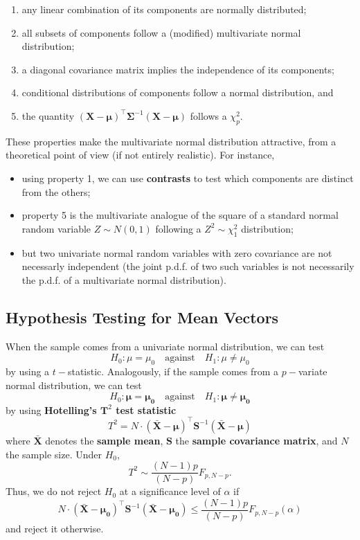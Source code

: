 \begin{enumerate}[noitemsep]
    \item any linear combination of its components are normally distributed;
    \item all subsets of components follow a (modified) multivariate normal distribution;
    \item a diagonal covariance matrix implies the independence of its components;
    \item conditional distributions of components follow a normal distribution, and 
    \item the quantity $(\bm{X}-\bm{\mu})^{\!\top}\bm{\Sigma}^{-1}(\bm{X}-\bm{\mu})$ follows a $\chi^{2}_{p}$.
\end{enumerate}
These properties make the multivariate normal distribution attractive, from a theoretical point of view (if not entirely realistic). For instance, 
\begin{itemize}[noitemsep]
\item using property 1, we can use \textbf{contrasts} to test which components are distinct from the others; \item property 5 is the multivariate analogue of the square of a standard normal random variable $Z\sim N(0,1)$ following a $Z^2\sim \chi^2_1$ distribution;
\item but two univariate normal random variables with zero covariance are not necessarly independent (the joint p.d.f. of two such variables is not necessarily the p.d.f. of a multivariate normal distribution).
\end{itemize}
\subsection{Hypothesis Testing for Mean Vectors}
When the sample comes from a univariate normal distribution, we can test $$H_{0}: \mu=\mu_{0}\quad\mbox{against}\quad H_{1}: \mu \neq \mu_{0}$$ by using a $t-$statistic. Analogously, if the sample comes from a $p-$variate normal distribution, we can test $$H_{0}: \bm{\mu}=\bm{\mu_{0}}\quad\mbox{against}\quad H_{1}: \bm{\mu} \neq \bm{\mu_{0}}$$ by using \textbf{Hotelling's $\bm{T}^2$ test statistic}
$$
    T^{2}=N\cdot (\bm{\bar{X}}-\bm{\mu})^{\!\top}\bm{S}^{-1}(\bm{\bar{X}}-\bm{\mu})
$$
where $\bm{\bar{X}}$ denotes the \textbf{sample mean}, $\bm{S}$ the \textbf{sample covariance matrix}, and $N$ the sample size. \newpage\noindent  
Under $H_{0}$, $$T^{2}\sim \frac{(N-1)p}{(N-p)}F_{p, N-p}.$$ Thus, we do not reject $H_{0}$ at a significance level of $\alpha$ if 
$$
    N\cdot (\bm{\bar{X}}-\bm{\mu_{0}})^{\!\top}\bm{S}^{-1}(\bm{\bar{X}}-\bm{\mu_{0}}) \leq \frac{(N-1)p}{(N-p)}F_{p, N-p}(\alpha)
$$
and reject it otherwise.
